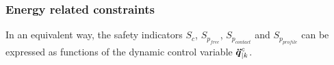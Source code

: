 \documentclass[letterpaper, 10 pt, conference]{ieeeconf}      %
\newcommand{\vect}[1]{\mbox{\boldmath${#1}$}}%
\begin{document}
\subsubsection{Energy related constraints}
In an equivalent way, the safety indicators $S_{c}$, $S_{p_{free}}$, $S_{p_{contact}}$ and $S_{p_{profile}}$ can be expressed as functions of the dynamic control variable $\vect{\ddot{q}}_{|k}^{c}$. \\ 
%
%
\end{document}
